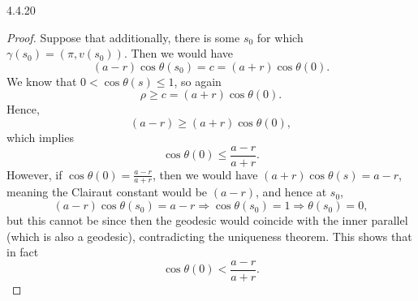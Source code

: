 \documentclass[11pt]{article}
\begin{document}
\begin{problem}{4.4.20}
\begin{enumerate}[label=\alph*.]
\begin{proof}
          Suppose that additionally, there is some \( s_0 \) for which \(\gamma(s_0) = (\pi, v(s_{0}))\).
          Then we would have
          \begin{equation}
            (a-r)\cos\theta(s_0) = c = (a+r)\cos\theta(0).
          \end{equation}
          We know that \( 0 < \cos\theta(s) \leq 1 \), so again
          \begin{equation}
          \label{eq:22}
          \rho \geq c = (a+r)\cos\theta(0).
        \end{equation}
        Hence,
        \begin{equation}
        \label{eq:23}
        (a-r) \geq (a+r)\cos\theta(0),
      \end{equation}
      which implies
      \begin{equation}
      \label{eq:24}
      \cos\theta(0) \leq \frac{a - r}{a + r}.
    \end{equation}
    However, if \( \cos\theta(0) = \frac{a-r}{a+r} \), then we would have \( (a+r)\cos\theta(s) = a-r \), meaning the Clairaut constant would be \( (a-r) \), and hence at \( s_0 \),
    \begin{equation}
    \label{eq:25}
    (a-r)\cos\theta(s_0) = a-r \Rightarrow \cos\theta(s_0) = 1 \Rightarrow \theta(s_0) = 0,
  \end{equation}
  but this cannot be since then the geodesic would coincide with the inner parallel (which is also a geodesic), contradicting the uniqueness theorem.
  This shows that in fact
  \begin{equation}
  \label{eq:26}
  \cos\theta(0) < \frac{a-r}{a+r}.
  \end{equation}
        \end{proof}
\end{enumerate}
\end{problem}
\end{document}

